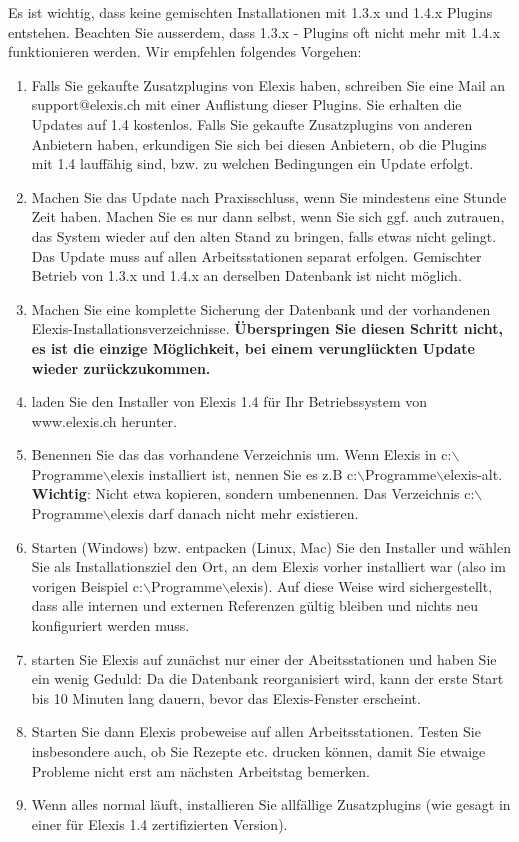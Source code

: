 \documentclass[a4paper]{scrartcl}
\begin{document}
\medskip

Es ist wichtig, dass keine gemischten Installationen mit 1.3.x und 1.4.x Plugins entstehen. Beachten Sie ausserdem, dass 1.3.x - Plugins oft nicht mehr mit 1.4.x funktionieren werden. Wir empfehlen folgendes Vorgehen:

\begin{enumerate}
\item Falls Sie gekaufte Zusatzplugins von Elexis haben, schreiben Sie eine Mail an support$@$elexis.ch mit einer Auflistung dieser Plugins. Sie erhalten die Updates auf 1.4 kostenlos.  Falls Sie gekaufte Zusatzplugins von anderen Anbietern haben, erkundigen Sie sich bei diesen Anbietern, ob die Plugins mit 1.4 lauffähig sind, bzw. zu welchen Bedingungen ein Update erfolgt.

\item Machen Sie das Update nach Praxisschluss, wenn Sie mindestens eine Stunde Zeit haben. Machen Sie es nur dann selbst, wenn Sie sich ggf. auch zutrauen, das System wieder auf den alten Stand zu bringen, falls etwas nicht gelingt. Das Update muss auf allen Arbeitsstationen separat erfolgen. Gemischter Betrieb von 1.3.x und 1.4.x an derselben Datenbank ist nicht möglich.
\item Machen Sie eine komplette Sicherung der Datenbank und der vorhandenen Elexis-Installationsverzeichnisse. \textbf{Überspringen Sie diesen Schritt nicht, es ist die einzige Möglichkeit, bei einem verunglückten Update wieder zurückzukommen.}
\item laden Sie den Installer von Elexis 1.4 für Ihr Betriebssystem von www.elexis.ch herunter.
\item Benennen Sie das das vorhandene Verzeichnis um. Wenn Elexis in c:$\backslash$Programme$\backslash$elexis installiert ist, nennen Sie es z.B c:$\backslash$Programme$\backslash$elexis-alt. \textbf{Wichtig}: Nicht etwa kopieren, sondern umbenennen. Das Verzeichnis c:$\backslash$Programme$\backslash$elexis darf danach nicht mehr existieren.
\item Starten (Windows) bzw. entpacken (Linux, Mac) Sie den Installer und wählen Sie als Installationsziel den Ort, an dem Elexis vorher installiert war (also im vorigen Beispiel c:$\backslash$Programme$\backslash$elexis). Auf diese Weise wird sichergestellt, dass alle internen und externen Referenzen gültig bleiben und nichts neu konfiguriert werden muss.
\item starten Sie Elexis auf zunächst nur einer der Abeitsstationen und haben Sie ein wenig Geduld: Da die Datenbank reorganisiert wird, kann der erste Start bis 10 Minuten lang dauern, bevor das Elexis-Fenster erscheint.
\item Starten Sie dann Elexis probeweise auf allen Arbeitsstationen. Testen Sie insbesondere auch, ob Sie Rezepte etc. drucken können, damit Sie etwaige Probleme nicht erst am nächsten Arbeitstag bemerken.
\item Wenn alles normal läuft, installieren Sie allfällige Zusatzplugins (wie gesagt in einer für Elexis 1.4 zertifizierten Version).
\end{enumerate}
\end{document}
